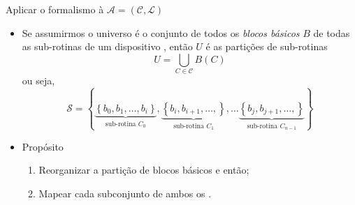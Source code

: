    
   \begin{frame}{Aplicar o formalismo à $\mathcal{A} = (\mathcal{C}, \mathcal{L})$}
      \begin{itemize}
         \item Se assumirmos o universo é o conjunto de todos os \textit{blocos básicos} $B$ de todas as sub-rotinas de um dispositivo \wearable, então $U$ é as partições de sub-rotinas
         \begin{equation}
            U = \bigcup_{C \in \mathcal{C}} B(C) \label{eq:bigcup}
         \end{equation}
         ou seja,
         \begin{equation}
            \mathcal{S}  = \left \{
            \underbrace{\left \{ b_0, b_1, \dots, b_i \right \}}_{\text{sub-rotina }C_0},
            \underbrace{\left \{ b_i, b_{i+1}, \dots, \right \}}_{\text{sub-rotina }C_1},\dots
            \underbrace{\left \{ b_j, b_{j+1}, \dots, \right \}}_{\text{sub-rotina }C_{n-1}}
            \right \}
         \end{equation}
        
         \item Propósito
         \begin{enumerate}
            \item Reorganizar a partição de blocos básicos e então;
            \item Mapear cada subconjunto de ambos os \hs.
         \end{enumerate}
         
      \end{itemize}
   \end{frame}
   
